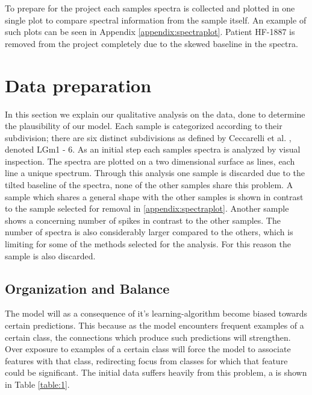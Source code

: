  
To prepare for the project each samples spectra is collected and plotted in one single plot to compare spectral information from the sample itself. An example of such plots can be seen in Appendix \ref{appendix:spectraplot}. Patient HF-1887 is removed from the project completely due to the skewed baseline in the spectra.


\section{Data preparation}
In this section we explain our qualitative analysis on the data, done to determine the plausibility of our model. Each sample is categorized according to their subdivision; there are six distinct subdivisions as defined by Ceccarelli et al. \cite{cellsubsets}, denoted LGm1 - 6. As an initial step each samples spectra is analyzed by visual inspection. The spectra are plotted on a two dimensional surface as lines, each line a unique spectrum. Through this analysis one sample is discarded due to the tilted baseline of the spectra, none of the other samples share this problem. A sample which shares a general shape with the other samples is shown in contrast to the sample selected for removal in \ref{appendix:spectraplot}. Another sample shows a concerning number of spikes in contrast to the other samples. The number of spectra is also considerably larger compared to the others, which is limiting for some of the methods selected for the analysis. For this reason the sample is also discarded.

\subsection{Organization and Balance}
The model will as a consequence of it's learning-algorithm become biased towards certain predictions. This because as the model encounters frequent examples of a certain class, the connections which produce such predictions will strengthen. Over exposure to examples of a certain class will force the model to associate features with that class, redirecting focus from classes for which that feature could be significant. The initial data suffers heavily from this problem, a is shown in Table \ref{table:1}.

\newpage

